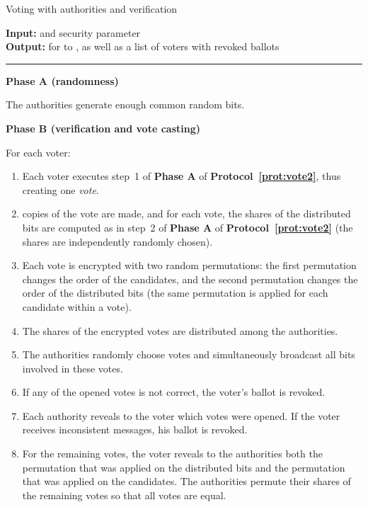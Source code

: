 \documentclass[runningheads]{llncs}
\begin{document}
\begin{protocol}[h]
\caption{Voting with authorities and verification}
\label{prot:vote3}

{\bf Input:} 
and security parameter   \\
{\bf Output:} for  to ,  as
well as a list of voters with revoked ballots
 \vspace{4pt} \hrule \vspace{4pt}

\textbf{Phase A (randomness)}

The authorities generate enough common random bits.

\textbf{Phase B (verification and vote casting)}

For each voter: \vspace{-.25cm}
\begin{enumerate}
\item Each voter executes step~1 of \textbf{Phase A} of
\textbf{Protocol~\ref{prot:vote2}}, thus creating one \emph{vote}.

\item  copies of the vote are made, and for each vote,  the shares of the distributed
bits are computed as in step~2 of \textbf{Phase A} of
\textbf{Protocol~\ref{prot:vote2}} (the shares are independently
randomly chosen).
\item  Each vote is encrypted with two random
permutations: the first permutation changes the order of the 
candidates, and the second permutation changes the order of the
 distributed bits (the same permutation is applied for each
candidate within a vote).
\item \label{prot3:distribute-votes}The shares of the encrypted votes are distributed among the
authorities.

\item \label{prot3:simbroadcast} The authorities randomly choose  votes and
simultaneously broadcast all bits involved in these votes.

\item If any of the opened votes is not correct, the voter's ballot is revoked.

\item \label{prot3:reveal}Each authority reveals to the voter which votes were opened.
If the voter receives  inconsistent messages, his ballot is revoked.

\item \label{prot3:voter-reveal} For the  remaining votes, the voter reveals to the authorities  both the
permutation that was applied on the distributed bits and the
permutation that was applied on the candidates. The authorities
permute their shares of the remaining votes so that all votes are
equal.



\end{enumerate}
\end{protocol}
\end{document}
